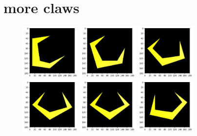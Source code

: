 \chapter{more claws}
\lhead[tempest 2000]{}
\label{sec:more_claws}
\lstset{style=68KStyle}

\begin{figure}[H]
  \centering
    \includegraphics[width=3cm]{build_t2k_claws/final_claw_0_graph.png}
    \includegraphics[width=3cm]{build_t2k_claws/final_claw_1_graph.png}
    \includegraphics[width=3cm]{build_t2k_claws/final_claw_2_graph.png}
    \includegraphics[width=3cm]{build_t2k_claws/final_claw_3_graph.png}
    \includegraphics[width=3cm]{build_t2k_claws/final_claw_4_graph.png}
    \includegraphics[width=3cm]{build_t2k_claws/final_claw_5_graph.png}

\end{figure}
